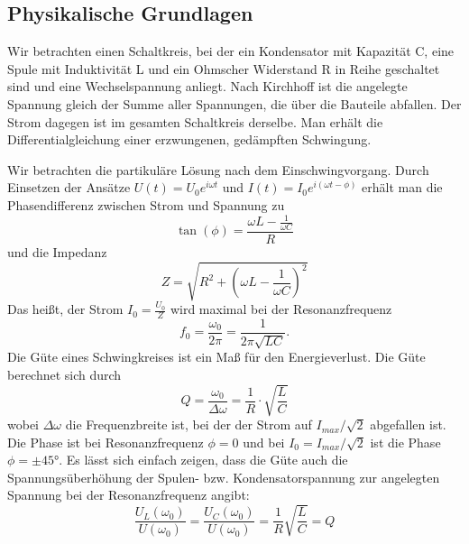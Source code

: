 \documentclass[12pt,a4paper]{article}
\begin{document}
\subsection{Physikalische Grundlagen}
Wir betrachten einen Schaltkreis, bei der ein Kondensator mit Kapazität C, eine Spule mit Induktivität L und ein Ohmscher Widerstand R in Reihe geschaltet sind und eine Wechselspannung anliegt. Nach Kirchhoff ist die angelegte Spannung gleich der Summe aller Spannungen, die über die Bauteile abfallen. Der Strom dagegen ist im gesamten Schaltkreis derselbe. Man erhält die Differentialgleichung einer erzwungenen, gedämpften Schwingung. 

Wir betrachten die partikuläre Lösung nach dem Einschwingvorgang. 
Durch Einsetzen der Ansätze $U(t)=U_0e^{i\omega t}$ und $I(t)=I_0e^{i(\omega t-\phi)}$ erhält man die Phasendifferenz zwischen Strom und Spannung zu
\begin{equation}
\tan(\phi)=\frac{\omega L-\frac{1}{\omega C}}{R}
\end{equation}
und die Impedanz
\begin{equation}
Z=\sqrt{R^2+(\omega L-\frac{1}{\omega C})^2}
\end{equation}
Das heißt, der Strom $I_0=\frac{U_0}{Z}$ wird maximal bei der Resonanzfrequenz
\begin{equation}
f_0=\frac{\omega_0}{2\pi}=\frac{1}{2\pi \sqrt{LC}}.
\end{equation}
Die Güte eines Schwingkreises ist ein Maß für den Energieverlust. Die Güte berechnet sich durch
\begin{equation}\label{eq:guete_aus_bauteile}
Q=\frac{\omega_0}{\Delta \omega}=\frac{1}{R}\cdot \sqrt{\frac{L}{C}}
\end{equation}
wobei $\Delta \omega$ die Frequenzbreite ist, bei der der Strom auf $I_{max}/\sqrt{2}$ abgefallen ist. Die Phase ist bei Resonanzfrequenz $\phi=0$ und bei $I_0=I_{max}/\sqrt{2}$ ist die Phase $\phi=\pm\ang{45}$.
Es lässt sich einfach zeigen, dass die Güte auch die Spannungsüberhöhung der Spulen- bzw. Kondensatorspannung zur angelegten Spannung bei der Resonanzfrequenz angibt:
\begin{equation}
\frac{U_L(\omega_0)}{U(\omega_0)}=\frac{U_C(\omega_0)}{U(\omega_0)}=\frac{1}{R}\sqrt{\frac{L}{C}}=Q
\end{equation}
\end{document}
